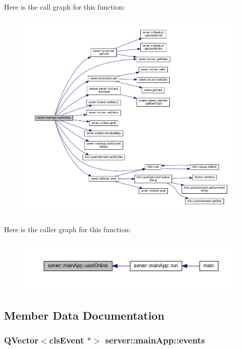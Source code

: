 Here is the call graph for this function\-:\nopagebreak
\begin{figure}[H]
\begin{center}
\leavevmode
\includegraphics[width=350pt]{d1/d48/classserver_1_1main_app_a92448c1219ad89999c983b04adaa4236_cgraph}
\end{center}
\end{figure}




Here is the caller graph for this function\-:
\nopagebreak
\begin{figure}[H]
\begin{center}
\leavevmode
\includegraphics[width=350pt]{d1/d48/classserver_1_1main_app_a92448c1219ad89999c983b04adaa4236_icgraph}
\end{center}
\end{figure}




\subsection{Member Data Documentation}
\hypertarget{classserver_1_1main_app_acafd4b774e4e3ee6333fb7477d114330}{
\subsubsection[{events}]{\setlength{\rightskip}{0pt plus 5cm}Q\-Vector$<${\bf cls\-Event} $\ast$$>$ server\-::main\-App\-::events\hspace{0.3cm}{\ttfamily [private]}}}\label{d1/d48/classserver_1_1main_app_acafd4b774e4e3ee6333fb7477d114330}


